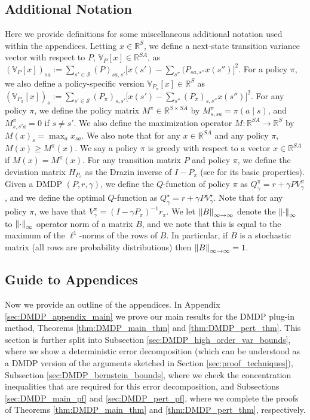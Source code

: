 \documentclass{article}
\theoremstyle{plain}
\theoremstyle{plain}
\theoremstyle{remark}
\theoremstyle{plain}
\theoremstyle{plain}
\newcommand{\R}{\mathbb{R}}
\newcommand{\Var}{\mathbb{V}}
\renewcommand{\S}{\mathcal{S}}
\newcommand{\plugin}{plug-in\xspace}
\begin{document}
\subsection{Additional Notation}
Here we provide definitions for some miscellaneous additional notation used within the appendices.
Letting $x \in \R^S$, we define a next-state transition variance vector with respect to $P$, $\Var_{P}\left[x \right] \in \R^{SA}$, as $\left(\Var_{P} \left[x \right]\right)_{sa} := \sum_{s' \in \S} \left(P\right)_{sa, s'} \big[x(s') - \sum_{s''}(P_{sa,s''}x(s'')\big]^2.$
For a policy $\pi$, we also define a policy-specific version $\Var_{P_{\pi}}\left[x \right] \in \R^{S}$ as
$\left(\Var_{P_{\pi}} \left[x \right]\right)_s := \sum_{s' \in \S} \left(P_{\pi}\right)_{s, s'} \big[x(s') - \sum_{s''}\left(P_{\pi}\right)_{s, s''}x(s'')\big]^2.$
For any policy $\pi$, we define the policy matrix $M^\pi \in \R^{S \times SA}$ by $M^\pi_{s, s a} = \pi(a \mid s)$, and $M^\pi_{s, s' a} = 0$ if $s \neq s'$. We also define the maximization operator $M : \R^{SA} \to \R^S$ by $M(x)_s = \max_{a} x_{sa}$. We also note that for any $x \in \R^{SA}$ and any policy $\pi$, $M(x) \geq M^\pi(x)$.
We say a policy $\pi$ is greedy with respect to a vector $x \in \R^{SA}$ if $M(x) = M^\pi(x)$.
For any transition matrix $P$ and policy $\pi$, we define the deviation matrix $H_{P_\pi}$ as the Drazin inverse of $I - P_\pi$ (see \cite[Appendix A]{puterman_markov_1994} for its basic properties).
Given a DMDP $(P, r, \gamma)$, we define the $Q$-function of policy $\pi$ as $Q_\gamma^\pi = r + \gamma P V_\gamma^\pi$, and we define the optimal $Q$-function as $Q^\star_\gamma = r + \gamma P V_\gamma^\star$. Note that for any policy $\pi$, we have that $V_\gamma^\pi = (I - \gamma P_\pi)^{-1}r_\pi$. We let $\left\Vert B\right\Vert _{\infty \to \infty}$ denote the $\left\Vert \cdot\right\Vert _{\infty}$ to $\left\Vert \cdot\right\Vert _{\infty}$ operator norm of a matrix $B$, and we note that this is equal to the maximum of the $\ell^1$-norms of the rows of $B$. In particular, if $B$ is a stochastic matrix (all rows are probability distributions) then $\left\Vert B\right\Vert _{\infty \to \infty} =1$.

\subsection{Guide to Appendices}

Now we provide an outline of the appendices.
In Appendix \ref{sec:DMDP_appendix_main} we prove our main results for the DMDP \plugin method, Theorems \ref{thm:DMDP_main_thm} and \ref{thm:DMDP_pert_thm}. This section is further split into Subsection \ref{sec:DMDP_high_order_var_bounds}, where we show a deterministic error decomposition (which can be understood as a DMDP version of the arguments sketched in Section \ref{sec:proof_techniques}), Subsection \ref{sec:DMDP_bernstein_bounds}, where we check the concentration inequalities that are required for this error decomposition, and Subsections \ref{sec:DMDP_main_pf} and \ref{sec:DMDP_pert_pf}, where we complete the proofs of Theorems \ref{thm:DMDP_main_thm} and \ref{thm:DMDP_pert_thm}, respectively. 
\end{document}
